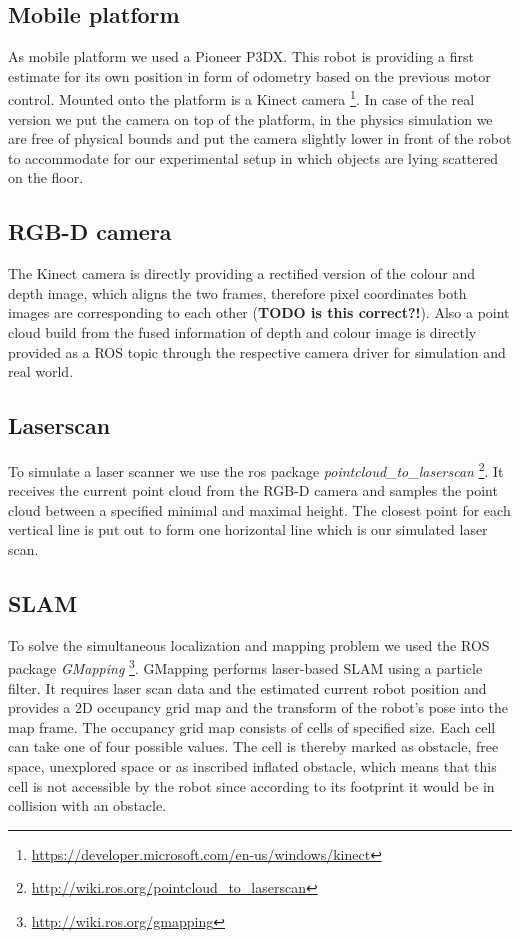 \documentclass[a4paper,11pt,english]{article}
\begin{document}
\subsection{Mobile platform}
As mobile platform we used a Pioneer P3DX. This robot is providing a first estimate for its own position in form of odometry based on the previous motor control. Mounted onto the platform is a Kinect camera \footnote{\url{https://developer.microsoft.com/en-us/windows/kinect}}. In case of the real version we put the camera on top of the platform, in the physics simulation we are free of physical bounds and put the camera slightly lower in front of the robot to accommodate for our experimental setup in which objects are lying scattered on the floor.

\subsection{RGB-D camera}
The Kinect camera is directly providing a rectified version of the colour and depth image, which aligns the two frames, therefore pixel coordinates both images are corresponding to each other (\textbf{TODO is this correct?!}).
Also a point cloud build from the fused information of depth and colour image is directly provided as a ROS topic through the respective camera driver for simulation and real world.

\subsection{Laserscan}
To simulate a laser scanner we use the ros package \textit{pointcloud\_to\_laserscan} \footnote{\url{http://wiki.ros.org/pointcloud_to_laserscan}}.
It receives the current point cloud from the RGB-D camera and samples the point cloud between a specified minimal and maximal height.
The closest point for each vertical line is put out to form one horizontal line which is our simulated laser scan.

\subsection{SLAM}
To solve the simultaneous localization and mapping problem we used the ROS package \textit{GMapping} \footnote{\url{http://wiki.ros.org/gmapping}}.
GMapping performs laser-based SLAM using a particle filter.
It requires laser scan data and the estimated current robot position and provides a 2D occupancy grid map and the transform of the robot's pose into the map frame.
The occupancy grid map consists of cells of specified size.
Each cell can take one of four possible values.
The cell is thereby marked as obstacle, free space, unexplored space or as inscribed inflated obstacle, which means that this cell is not accessible by the robot since according to its footprint it would be in collision with an obstacle.
\end{document}

